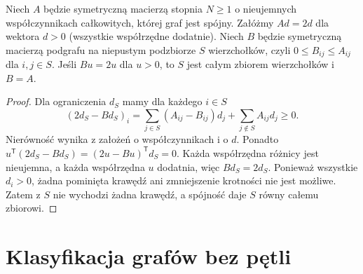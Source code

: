 \begin{lemat}
\label{aa:lem:mckay-subgraph}
Niech $A$ będzie symetryczną macierzą stopnia $N\ge1$
o nieujemnych współczynnikach całkowitych, której
graf jest spójny.
Załóżmy $Ad=2d$ dla wektora $d>0$ (wszystkie współrzędne
dodatnie). Niech $B$ będzie symetryczną macierzą
podgrafu na niepustym podzbiorze $S$ wierzchołków,
czyli $0\le B_{ij}\le A_{ij}$ dla $i,j\in S$.
Jeśli $Bu=2u$ dla $u>0$, to $S$ jest całym zbiorem
wierzchołków i $B=A$.
\end{lemat}
\begin{proof}
Dla ograniczenia $d_S$ mamy dla każdego $i\in S$
\[
 (2d_S-Bd_S)_i=
 \sum_{j\in S}(A_{ij}-B_{ij})d_j+
 \sum_{j\notin S}A_{ij}d_j\ge0.
\]
Nierówność wynika z założeń o współczynnikach i o $d$. Ponadto
$u^{\mathsf T}(2d_S-Bd_S)=(2u-Bu)^{\mathsf T}d_S=0$.
Każda współrzędna różnicy jest nieujemna, a każda
współrzędna $u$ dodatnia, więc $Bd_S=2d_S$.
Ponieważ wszystkie $d_i>0$, żadna pominięta krawędź
ani zmniejszenie krotności nie jest możliwe.
Zatem z $S$ nie wychodzi żadna krawędź, a spójność daje
$S$ równy całemu zbiorowi.
\end{proof}

\section{Klasyfikacja grafów bez pętli}

